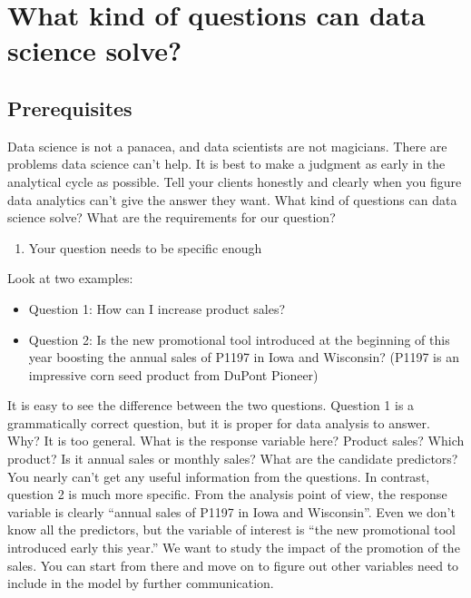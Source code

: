 \documentclass[12pt,]{krantz}
\providecommand{\tightlist}{%
  \setlength{\itemsep}{0pt}\setlength{\parskip}{0pt}}
\theoremstyle{definition}
\theoremstyle{definition}
\theoremstyle{remark}
\begin{document}
\section{What kind of questions can data science
solve?}\label{what-kind-of-questions-can-data-science-solve}

\subsection{Prerequisites}\label{prerequisites}

Data science is not a panacea, and data scientists are not magicians.
There are problems data science can't help. It is best to make a
judgment as early in the analytical cycle as possible. Tell your clients
honestly and clearly when you figure data analytics can't give the
answer they want. What kind of questions can data science solve? What
are the requirements for our question?

\begin{enumerate}
\def\labelenumi{\arabic{enumi}.}
\tightlist
\item
  Your question needs to be specific enough
\end{enumerate}

Look at two examples:

\begin{itemize}
\tightlist
\item
  Question 1: How can I increase product sales?
\item
  Question 2: Is the new promotional tool introduced at the beginning of
  this year boosting the annual sales of P1197 in Iowa and Wisconsin?
  (P1197 is an impressive corn seed product from DuPont Pioneer)
\end{itemize}

It is easy to see the difference between the two questions. Question 1
is a grammatically correct question, but it is proper for data analysis
to answer. Why? It is too general. What is the response variable here?
Product sales? Which product? Is it annual sales or monthly sales? What
are the candidate predictors? You nearly can't get any useful
information from the questions. In contrast, question 2 is much more
specific. From the analysis point of view, the response variable is
clearly ``annual sales of P1197 in Iowa and Wisconsin''. Even we don't
know all the predictors, but the variable of interest is ``the new
promotional tool introduced early this year.'' We want to study the
impact of the promotion of the sales. You can start from there and move
on to figure out other variables need to include in the model by further
communication.
\end{document}
